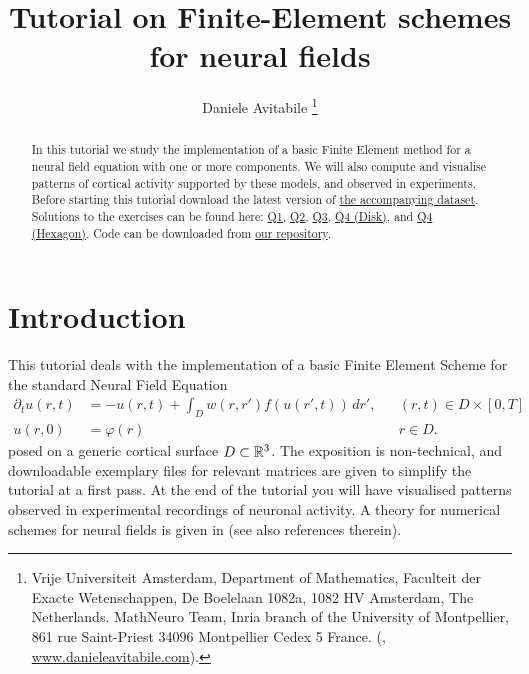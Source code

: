 \documentclass[a4paper]{siamonline220329}
\title{Tutorial on Finite-Element schemes for neural fields}
\author{ Daniele Avitabile
\thanks{ Vrije Universiteit Amsterdam, Department of
  Mathematics, Faculteit der Exacte Wetenschappen, De Boelelaan 1082a, 1082 HV
  Amsterdam, The Netherlands. \protect MathNeuro Team, Inria branch of the University
  of Montpellier, 861 rue Saint-Priest 34096 Montpellier Cedex 5 France. \protect
(\email{d.avitabile@vu.nl}, \url{www.danieleavitabile.com}). }
}
\theoremstyle{plain}
\renewcommand\phi\varphi
\begin{document}
\maketitle

\begin{abstract}
  In this tutorial we study the implementation of a basic Finite Element method for a
  neural field equation with one or more components. We will also compute and
  visualise patterns of cortical activity supported by these models, and observed in
  experiments. Before starting this tutorial download the latest version of
  \href{https://zenodo.org/records/11120604}{the accompanying
  dataset}. Solutions to the exercises can be found here:
  \href{http://htmlpreview.github.io/?https://github.com/danieleavitabile/numerical-analysis-mathematical-neuroscience/blob/main/Tutorials/Tutorial2/Solutions/Question1/html/driver.html}{Q1},
  \href{http://htmlpreview.github.io/?https://github.com/danieleavitabile/numerical-analysis-mathematical-neuroscience/blob/main/Tutorials/Tutorial2/Solutions/Question2/html/driver.html}{Q2},
  \href{http://htmlpreview.github.io/?https://github.com/danieleavitabile/numerical-analysis-mathematical-neuroscience/blob/main/Tutorials/Tutorial2/Solutions/Question3/html/driver.html}{Q3},
  \href{http://htmlpreview.github.io/?https://github.com/danieleavitabile/numerical-analysis-mathematical-neuroscience/blob/main/Tutorials/Tutorial2/Solutions/Question4/Disk/html/driver.html}{Q4 (Disk)},
  and
  \href{http://htmlpreview.github.io/?https://github.com/danieleavitabile/numerical-analysis-mathematical-neuroscience/blob/main/Tutorials/Tutorial2/Solutions/Question4/Hexagon/html/driver.html}{Q4 (Hexagon)}.
  Code can be downloaded from
  \href{https://github.com/danieleavitabile/numerical-analysis-mathematical-neuroscience/tree/main}{our
  repository}.
\end{abstract}


\section{Introduction}\label{sec:introduction} 
This tutorial deals with the implementation of a basic Finite Element Scheme for the
standard Neural Field Equation
\[
  \label{eq:NF}
  \begin{aligned}
    \partial_{t} u(r,t) & = -u(r,t) + \int_{D} w(r,r') f(u(r',t))\,d r',
                        && (r,t) \in D \times [0,T] \\
    u(r,0) & = \phi(r)
           && r \in D.
  \end{aligned}
\]
posed on a generic cortical surface $D \subset \mathbb{R}^3$. The exposition is
non-technical, and downloadable exemplary files for relevant matrices are given to
simplify the tutorial at a first pass. At the end of the tutorial you will have
visualised patterns observed in experimental recordings of neuronal activity. A
theory for numerical schemes for neural fields is given in
\cite{avitabileProjectionMethodsNeural2023} (see also references therein).
\end{document}
